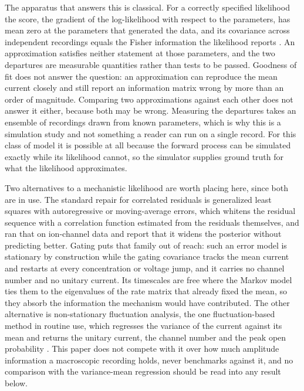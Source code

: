 The apparatus that answers this is classical. For a correctly specified likelihood the score, the
gradient of the log-likelihood with respect to the parameters, has mean zero at the parameters that
generated the data, and its covariance across independent recordings equals the Fisher information
the likelihood reports \citep{huber1967behavior,white1982maximum}. An approximation satisfies neither
statement at those parameters, and the two departures are measurable quantities rather than tests to
be passed. Goodness of fit does not answer the question: an approximation can reproduce the mean
current closely and still report an information matrix wrong by more than an order of magnitude.
Comparing two approximations against each other does not answer it either, because both may be
wrong. Measuring the departures takes an ensemble of recordings drawn from known parameters, which is
why this is a simulation study and not something a reader can run on a single record. For this class
of model it is possible at all because the forward process can be simulated exactly while its
likelihood cannot, so the simulator supplies ground truth for what the likelihood approximates.

Two alternatives to a mechanistic likelihood are worth placing here, since both are in use. The
standard repair for correlated residuals is generalized least squares with autoregressive or
moving-average errors, which whitens the residual sequence with a correlation function estimated
from the residuals themselves, and \citet{lei2020considering} ran that on ion-channel data and
report that it widens the posterior without predicting better. Gating puts that family out of
reach: such an error model is stationary by construction while the gating covariance tracks the
mean current and restarts at every concentration or voltage jump, and it carries no channel number
and no unitary current. Its timescales are free where the Markov model ties them to the eigenvalues
of the rate matrix that already fixed the mean, so they absorb the information the mechanism would
have contributed. The other alternative is
non-stationary fluctuation analysis, the one fluctuation-based method in routine use, which regresses
the variance of the current against its mean and returns the unitary current, the channel number and
the peak open probability \citep{stepanyuk2014maximum}. This paper does not compete with it over how
much amplitude information a macroscopic recording holds, never benchmarks against it, and no
comparison with the variance-mean regression should be read into any result below.

